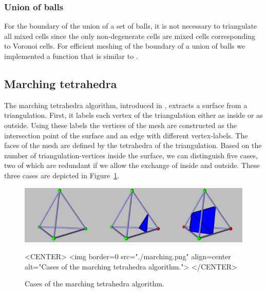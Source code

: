 \subsubsection{Union of balls}
For the boundary of the union of a set of balls, it is not necessary
to triangulate all mixed cells since the only non-degenerate cells are
mixed cells corresponding to Voronoi cells. For efficient meshing of
the boundary of a union of balls we implemented a function
 that is similar to
.



\subsection{Marching tetrahedra}
The marching tetrahedra algorithm, introduced in
\cite{cgal:tpg-rmtiise-99}, extracts a surface from a triangulation.
First, it labels each vertex of the triangulation either as inside or
as outside. Using these labels the vertices of the mesh are
constructed as the intersection point of the surface and an edge with
different vertex-labels. The faces of the mesh are defined by the
tetrahedra of the triangulation. Based on the number of
triangulation-vertices inside the surface, we can distinguish five
cases, two of which are redundant if we allow the exchange of inside
and outside. These three cases are depicted in
Figure~\ref{SkinSurface3-fig-marching}.

\begin{figure}
\begin{ccTexOnly}
\begin{center}
\includegraphics[width=\textwidth]{Skin_surface_3/marching}
\end{center}
\end{ccTexOnly}
\caption{Cases of the marching tetrahedra algorithm.
\label{SkinSurface3-fig-marching}}
\begin{ccHtmlOnly}
<CENTER>
<img border=0 src="./marching.png" align=center
alt="Cases of the marching tetrahedra algorithm.">
</CENTER>
\end{ccHtmlOnly}
\end{figure}

